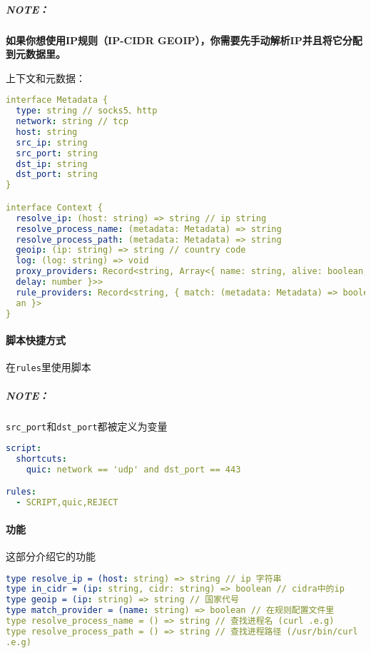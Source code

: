 \subparagraph{NOTE：}{\bfseries 如果你想使用IP规则（IP-CIDR GEOIP），你需要先手动解析IP并且将它分配到元数据里。}

上下文和元数据：\\

\begin{lstlisting}[breaklines=true,language=yaml,style=yaml]
interface Metadata {
  type: string // socks5、http
  network: string // tcp
  host: string
  src_ip: string
  src_port: string
  dst_ip: string
  dst_port: string
}

interface Context {
  resolve_ip: (host: string) => string // ip string
  resolve_process_name: (metadata: Metadata) => string
  resolve_process_path: (metadata: Metadata) => string
  geoip: (ip: string) => string // country code
  log: (log: string) => void
  proxy_providers: Record<string, Array<{ name: string, alive: boolean, 
  delay: number }>>
  rule_providers: Record<string, { match: (metadata: Metadata) => boole
  an }>
}
\end{lstlisting}


\paragraph{脚本快捷方式}
在\verb|rules|里使用脚本
\subparagraph{NOTE：}\verb|src_port|和\verb|dst_port|都被定义为变量\\

\begin{lstlisting}[breaklines=true,language=yaml,style=yaml]
script:
  shortcuts:
    quic: network == 'udp' and dst_port == 443

rules:
  - SCRIPT,quic,REJECT
\end{lstlisting}

\paragraph{功能}这部分介绍它的功能

\begin{lstlisting}[breaklines=true,language=yaml,style=yaml]
type resolve_ip = (host: string) => string // ip 字符串
type in_cidr = (ip: string, cidr: string) => boolean // cidra中的ip
type geoip = (ip: string) => string // 国家代号
type match_provider = (name: string) => boolean // 在规则配置文件里
type resolve_process_name = () => string // 查找进程名 (curl .e.g)
type resolve_process_path = () => string // 查找进程路径 (/usr/bin/curl 
.e.g)
\end{lstlisting}

